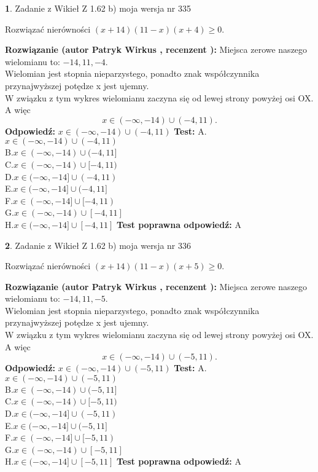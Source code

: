 \documentclass[12pt, a4paper]{article}
\theoremstyle{definition} %
\newtheorem{zad}{}
\newcommand{\zadStart}[1]{\begin{zad}#1\newline}
\newcommand{\zadStop}{\end{zad}}
\newcommand{\rozwStart}[2]{\noindent \textbf{Rozwiązanie (autor #1 , recenzent #2): }\newline}
\newcommand{\rozwStop}{\newline}
\newcommand{\odpStart}{\noindent \textbf{Odpowiedź:}\newline}
\newcommand{\odpStop}{\newline}
\newcommand{\testStart}{\noindent \textbf{Test:}\newline}
\newcommand{\testStop}{\newline}
\newcommand{\kluczStart}{\noindent \textbf{Test poprawna odpowiedź:}\newline}
\newcommand{\kluczStop}{\newline}
\begin{document}
\zadStart{Zadanie z Wikieł Z 1.62 b) moja wersja nr 335}

Rozwiązać nierówności $(x+14)(11-x)(x+4)\ge0$.
\zadStop
\rozwStart{Patryk Wirkus}{}
Miejsca zerowe naszego wielomianu to: $-14, 11, -4$.\\
Wielomian jest stopnia nieparzystego, ponadto znak współczynnika przy\linebreak najwyższej potędze x jest ujemny.\\ W związku z tym wykres wielomianu zaczyna się od lewej strony powyżej osi OX. A więc $$x \in (-\infty,-14) \cup (-4,11).$$
\rozwStop
\odpStart
$x \in (-\infty,-14) \cup (-4,11)$
\odpStop
\testStart
A.$x \in (-\infty,-14) \cup (-4,11)$\\
B.$x \in (-\infty,-14) \cup (-4,11]$\\
C.$x \in (-\infty,-14) \cup [-4,11)$\\
D.$x \in (-\infty,-14] \cup (-4,11)$\\
E.$x \in (-\infty,-14] \cup (-4,11]$\\
F.$x \in (-\infty,-14] \cup [-4,11)$\\
G.$x \in (-\infty,-14) \cup [-4,11]$\\
H.$x \in (-\infty,-14] \cup [-4,11]$
\testStop
\kluczStart
A
\kluczStop



\zadStart{Zadanie z Wikieł Z 1.62 b) moja wersja nr 336}

Rozwiązać nierówności $(x+14)(11-x)(x+5)\ge0$.
\zadStop
\rozwStart{Patryk Wirkus}{}
Miejsca zerowe naszego wielomianu to: $-14, 11, -5$.\\
Wielomian jest stopnia nieparzystego, ponadto znak współczynnika przy\linebreak najwyższej potędze x jest ujemny.\\ W związku z tym wykres wielomianu zaczyna się od lewej strony powyżej osi OX. A więc $$x \in (-\infty,-14) \cup (-5,11).$$
\rozwStop
\odpStart
$x \in (-\infty,-14) \cup (-5,11)$
\odpStop
\testStart
A.$x \in (-\infty,-14) \cup (-5,11)$\\
B.$x \in (-\infty,-14) \cup (-5,11]$\\
C.$x \in (-\infty,-14) \cup [-5,11)$\\
D.$x \in (-\infty,-14] \cup (-5,11)$\\
E.$x \in (-\infty,-14] \cup (-5,11]$\\
F.$x \in (-\infty,-14] \cup [-5,11)$\\
G.$x \in (-\infty,-14) \cup [-5,11]$\\
H.$x \in (-\infty,-14] \cup [-5,11]$
\testStop
\kluczStart
A
\kluczStop
\end{document}

